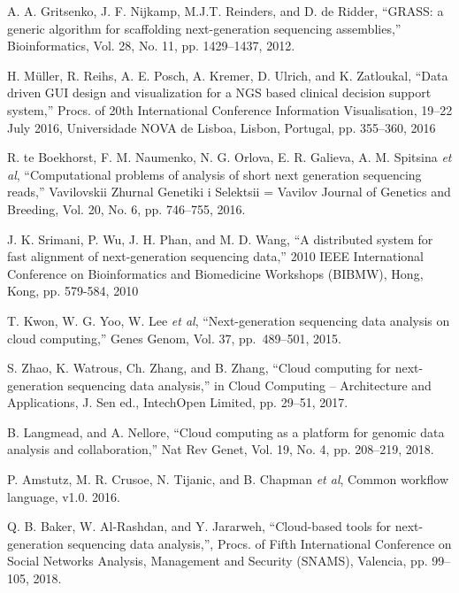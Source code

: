 \documentclass[a4paper]{jpconf}
\begin{document}
\begin{thebibliography}{00}
 A. A. Gritsenko, J. F. Nijkamp, M.J.T. Reinders, and D. de Ridder, ``GRASS: a generic algorithm for scaffolding next-generation sequencing assemblies,'' Bioinformatics, Vol. 28, No. 11, pp. 1429–1437, 2012. 

 H. Müller, R. Reihs, A. E. Posch, A. Kremer, D. Ulrich, and K. Zatloukal, ``Data driven GUI design and visualization for a NGS based clinical decision support system,'' Procs. of 20th International Conference Information Visualisation, 19--22 July 2016, Universidade NOVA de Lisboa, Lisbon, Portugal, pp. 355--360, 2016 

 R. te Boekhorst, F. M. Naumenko, N. G. Orlova, E. R. Galieva, A. M. Spitsina \emph{et al}, ``Computational problems of analysis of short next generation sequencing reads,'' Vavilovskii Zhurnal Genetiki i Selektsii = Vavilov Journal of Genetics and Breeding, Vol. 20, No. 6, pp. 746--755, 2016. 

 J. K. Srimani, P. Wu, J. H. Phan, and M. D. Wang, ``A distributed system for fast alignment of next-generation sequencing data,'' 2010 IEEE International Conference on Bioinformatics and Biomedicine Workshops (BIBMW), Hong, Kong, pp. 579-584, 2010 

 T. Kwon, W. G. Yoo, W. Lee \emph{et al}, ``Next-generation sequencing data analysis on cloud computing,'' Genes Genom, Vol. 37, pp.~489--501, 2015. 

 S. Zhao, K. Watrous, Ch. Zhang, and B. Zhang, ``Cloud computing for next-generation sequencing data analysis,'' in Cloud Computing -- Architecture and Applications, J. Sen ed., IntechOpen Limited, pp. 29--51, 2017. 

 B. Langmead, and A. Nellore, ``Cloud computing as a platform for genomic data analysis and collaboration,'' Nat Rev Genet, Vol. 19, No. 4, pp. 208--219, 2018. 

 P. Amstutz, M. R. Crusoe, N. Tijanic, and B. Chapman \emph{et al}, Common workflow language, v1.0. 2016. 

 Q. B. Baker, W. Al-Rashdan, and Y. Jararweh, ``Cloud-based tools for next-generation sequencing data analysis,'', Procs. of Fifth International Conference on Social Networks Analysis, Management and Security (SNAMS), Valencia, pp. 99--105, 2018. 


\end{thebibliography}
\end{document}
